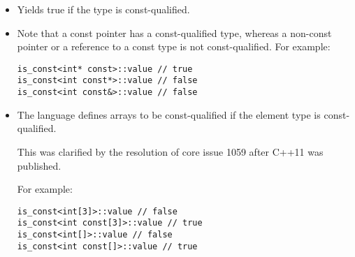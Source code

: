 \begin{itemize}
\item 
Yields true if the type is const-qualified.

\item 
Note that a const pointer has a const-qualified type, whereas a non-const pointer or a reference to a const type is not const-qualified. For example:
\begin{lstlisting}[style=styleCXX]
is_const<int* const>::value // true
is_const<int const*>::value // false
is_const<int const&>::value // false
\end{lstlisting}

\item 
The language defines arrays to be const-qualified if the element type is const-qualified.

\begin{tcolorbox}[colback=webgreen!5!white,colframe=webgreen!75!black]
\hspace*{0.75cm}This was clarified by the resolution of core issue 1059 after C++11 was published.
\end{tcolorbox}

For example:
\begin{lstlisting}[style=styleCXX]
is_const<int[3]>::value // false
is_const<int const[3]>::value // true
is_const<int[]>::value // false
is_const<int const[]>::value // true
\end{lstlisting}

\end{itemize}

